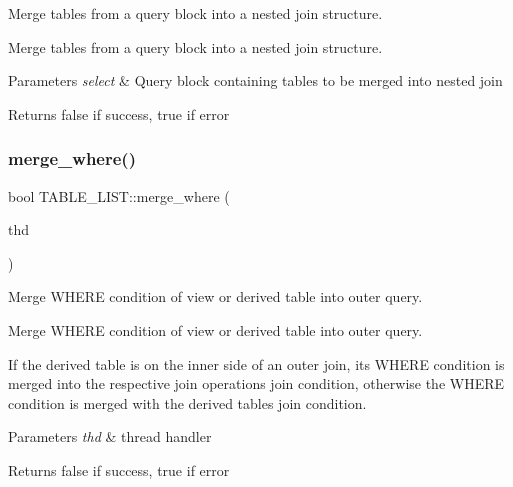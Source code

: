 Merge tables from a query block into a nested join structure. 

Merge tables from a query block into a nested join structure.


\begin{DoxyParams}{Parameters}
{\em select} & Query block containing tables to be merged into nested join\\
\hline
\end{DoxyParams}
\begin{DoxyReturn}{Returns}
false if success, true if error 
\end{DoxyReturn}
\mbox{\label{structTABLE__LIST_aef94fa3856c0c8023095727e07915cb9}} 
\subsubsection{\texorpdfstring{merge\+\_\+where()}{merge\_where()}}
{\footnotesize\ttfamily bool T\+A\+B\+L\+E\+\_\+\+L\+I\+S\+T\+::merge\+\_\+where (\begin{DoxyParamCaption}\item[{T\+HD $\ast$}]{thd }\end{DoxyParamCaption})}



Merge W\+H\+E\+RE condition of view or derived table into outer query. 

Merge W\+H\+E\+RE condition of view or derived table into outer query.

If the derived table is on the inner side of an outer join, its W\+H\+E\+RE condition is merged into the respective join operation\textquotesingle{}s join condition, otherwise the W\+H\+E\+RE condition is merged with the derived table\textquotesingle{}s join condition.


\begin{DoxyParams}{Parameters}
{\em thd} & thread handler\\
\hline
\end{DoxyParams}
\begin{DoxyReturn}{Returns}
false if success, true if error 
\end{DoxyReturn}
\mbox{\label{structTABLE__LIST_a0410916850db388be734dad75e4dcb8a}} 
